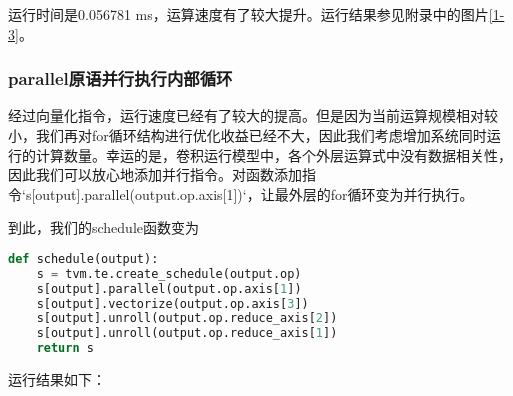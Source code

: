 运行时间是0.056781 ms，运算速度有了较大提升。运行结果参见附录中的图片\textcolor{MidnightBlue}{\ref{1-3}}。

\subsubsection{parallel原语并行执行内部循环}

经过向量化指令，运行速度已经有了较大的提高。但是因为当前运算规模相对较小，我们再对for循环结构进行优化收益已经不大，因此我们考虑增加系统同时运行的计算数量。幸运的是，卷积运行模型中，各个外层运算式中没有数据相关性，因此我们可以放心地添加并行指令。对函数添加指令`s[output].parallel(output.op.axis[1])`，让最外层的for循环变为并行执行。

到此，我们的schedule函数变为

\begin{lstlisting}[caption=小输入部分优化函数,language=python]
def schedule(output):
    s = tvm.te.create_schedule(output.op)
    s[output].parallel(output.op.axis[1])
    s[output].vectorize(output.op.axis[3])
    s[output].unroll(output.op.reduce_axis[2])
    s[output].unroll(output.op.reduce_axis[1])
    return s
\end{lstlisting}

运行结果如下：

